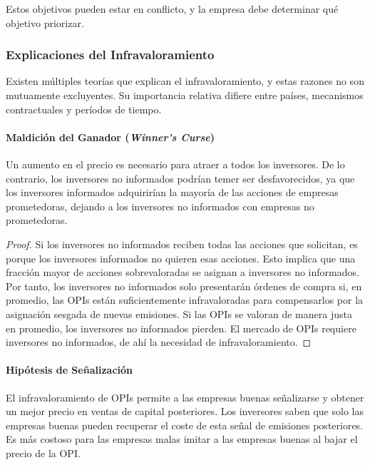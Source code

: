 Estos objetivos pueden estar en conflicto, y la empresa debe determinar qué objetivo priorizar.

\subsubsection{Explicaciones del Infravaloramiento}

Existen múltiples teorías que explican el infravaloramiento, y estas razones no son mutuamente excluyentes. Su importancia relativa difiere entre países, mecanismos contractuales y períodos de tiempo.

\paragraph{Maldición del Ganador (\textit{Winner's Curse})}

\begin{teorema}
Un aumento en el precio es necesario para atraer a todos los inversores. De lo contrario, los inversores no informados podrían temer ser desfavorecidos, ya que los inversores informados adquirirían la mayoría de las acciones de empresas prometedoras, dejando a los inversores no informados con empresas no prometedoras.
\end{teorema}

\begin{proof}
Si los inversores no informados reciben todas las acciones que solicitan, es porque los inversores informados no quieren esas acciones. Esto implica que una fracción mayor de acciones sobrevaloradas se asignan a inversores no informados. Por tanto, los inversores no informados solo presentarán órdenes de compra si, en promedio, las OPIs están suficientemente infravaloradas para compensarlos por la asignación sesgada de nuevas emisiones. Si las OPIs se valoran de manera justa en promedio, los inversores no informados pierden. El mercado de OPIs requiere inversores no informados, de ahí la necesidad de infravaloramiento.
\end{proof}

\paragraph{Hipótesis de Señalización}

\begin{teorema}
El infravaloramiento de OPIs permite a las empresas buenas señalizarse y obtener un mejor precio en ventas de capital posteriores. Los inversores saben que solo las empresas buenas pueden recuperar el coste de esta señal de emisiones posteriores. Es más costoso para las empresas malas imitar a las empresas buenas al bajar el precio de la OPI.
\end{teorema}

